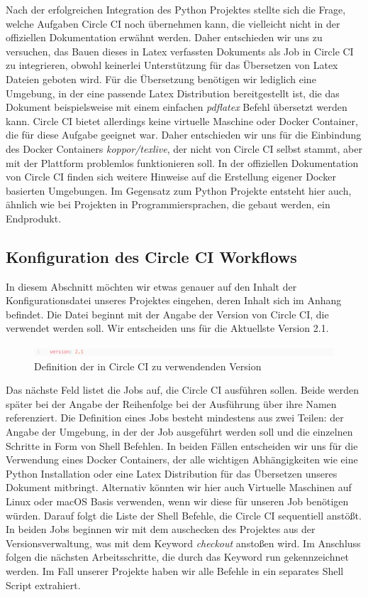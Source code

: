 \documentclass[11pt]{article}
\begin{document}
Nach der erfolgreichen Integration des Python Projektes stellte sich die Frage, welche Aufgaben Circle CI noch übernehmen kann, die vielleicht nicht in der offiziellen Dokumentation erwähnt werden. Daher entschieden wir uns zu versuchen, das Bauen dieses in Latex verfassten Dokuments als Job in Circle CI zu integrieren, obwohl keinerlei Unterstützung für das Übersetzen von Latex Dateien geboten wird. Für die Übersetzung benötigen wir lediglich eine Umgebung, in der eine passende Latex Distribution bereitgestellt ist, die das Dokument beispielsweise mit einem einfachen \textit{pdflatex} Befehl übersetzt werden kann. Circle CI bietet allerdings keine virtuelle Maschine oder Docker Container, die für diese Aufgabe geeignet war. Daher entschieden wir uns für die Einbindung des Docker Containers \textit{koppor/texlive}, der nicht von Circle CI selbst stammt, aber mit der Plattform problemlos funktionieren soll. In der offiziellen Dokumentation von Circle CI finden sich weitere Hinweise auf die Erstellung eigener Docker basierten Umgebungen. Im Gegensatz zum Python Projekte entsteht hier auch, ähnlich wie bei Projekten in Programmiersprachen, die gebaut werden, ein Endprodukt.

\subsection{Konfiguration des Circle CI Workflows}
In diesem Abschnitt möchten wir etwas genauer auf den Inhalt der Konfigurationsdatei unseres Projektes eingehen, deren Inhalt sich im Anhang befindet. Die Datei beginnt mit der Angabe der Version von Circle CI, die verwendet werden soll. Wir entscheiden uns für die Aktuellste Version 2.1.

\begin{figure}[H]
	\centering
  	\includegraphics[width=1\linewidth]{../Images/Config/Version}
  	\caption{Definition der in Circle CI zu verwendenden Version}
  	\label{fig:version}
\end{figure}

Das nächste Feld listet die Jobs auf, die Circle CI ausführen sollen. Beide werden später bei der Angabe der Reihenfolge bei der Ausführung über ihre Namen referenziert. Die Definition eines Jobs besteht mindestens aus zwei Teilen: der Angabe der Umgebung, in der der Job ausgeführt werden soll und die einzelnen Schritte in Form von Shell Befehlen. In beiden Fällen entscheiden wir uns für die Verwendung eines Docker Containers, der alle wichtigen Abhängigkeiten wie eine Python Installation oder eine Latex Distribution für das Übersetzen unseres Dokument mitbringt. Alternativ könnten wir hier auch Virtuelle Maschinen auf Linux oder macOS Basis verwenden, wenn wir diese für unseren Job benötigen würden.
Darauf folgt die Liste der Shell Befehle, die Circle CI sequentiell anstößt. In beiden Jobs beginnen wir mit dem auschecken des Projektes aus der Versionsverwaltung, was mit dem Keyword \textit{checkout} anstoßen wird. Im Anschluss folgen die nächsten Arbeitsschritte, die durch das Keyword run gekennzeichnet werden. Im Fall unserer Projekte haben wir alle Befehle in ein separates Shell Script extrahiert.
\end{document}
